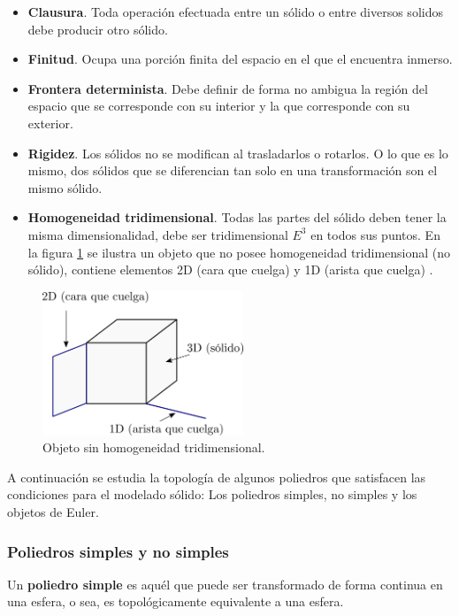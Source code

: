 \begin{itemize}
    \item \textbf{Clausura}. 
    Toda operación efectuada entre un sólido o entre diversos solidos debe producir otro sólido.
    \item \textbf{Finitud}. 
    Ocupa una porción finita del espacio en el que el encuentra inmerso.
    \item \textbf{Frontera determinista}. 
    Debe definir de forma no ambigua la región del espacio que se corresponde con su interior y la que corresponde con su exterior.
    
    \item \textbf{Rigidez}. Los sólidos no se modifican al trasladarlos o rotarlos. O lo que es lo mismo, dos sólidos que se diferencian tan solo en una transformación son el mismo sólido.
    \item \textbf{Homogeneidad tridimensional}. Todas las partes del sólido deben tener la misma dimensionalidad, debe ser tridimensional $E^3$ en todos sus puntos. En la figura \ref{fig:geo-noregular} se ilustra un objeto que no posee homogeneidad tridimensional (no sólido), contiene elementos 2D (cara que cuelga) y 1D (arista que cuelga)  \citep{Torres2014}.
\end{itemize}



\begin{figure}[ht]
\includegraphics[width=6cm]{Img/GEO/geo-noregular.png}
\centering
\caption{\footnotesize{Objeto sin homogeneidad tridimensional.} }
\label{fig:geo-noregular}
\end{figure}


A continuación se estudia la topología de algunos poliedros que satisfacen las condiciones para el modelado sólido: Los poliedros simples, no simples y los objetos de Euler.\newline

\subsubsection{Poliedros simples y no simples}\newline
    Un \textbf{poliedro simple} es aquél que puede ser transformado de forma continua en una esfera, o sea, es topológicamente equivalente a una esfera.

